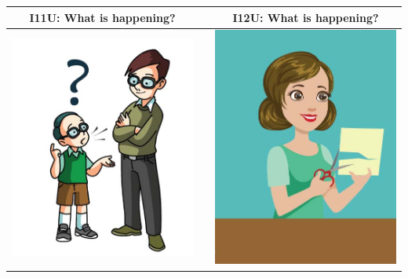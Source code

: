 \documentclass[12pt,notitlepage]{article}
\begin{document}
\begin{center}
\begin{tabular}{|c|c|c|}
\hline
I11U: What is happening? && I12U: What is happening? \\
\hline
\includegraphics[width=20em,trim=0 0 0 -3]{figures/I11.jpg} & & \includegraphics[width=20em,trim=0 0 0 -3]{figures/I12.jpg} \\
\hline
\end{tabular}
\vspace{1em} \\



\end{center}
\end{document}
